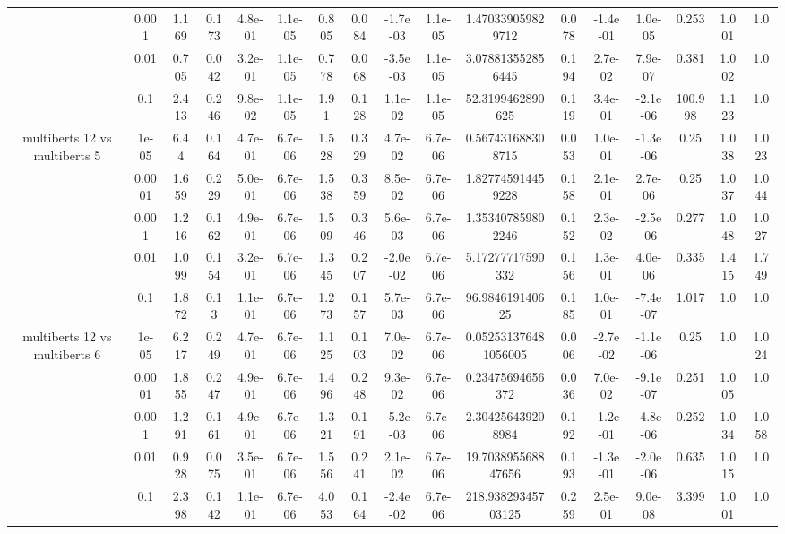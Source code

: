 \begin{tabular}{|c|c|c|c|c|c|c|c|c|c|c|c|c|c|c|c|c|}
 & 0.001 & 1.169 & 0.173 & 4.8e-01 & 1.1e-05 & 0.805 & 0.084 & -1.7e-03 & 1.1e-05 & 1.470339059829712 & 0.078 & -1.4e-01 & 1.0e-05 & 0.253 & 1.001 & 1.0 \\
 & 0.01 & 0.705 & 0.042 & 3.2e-01 & 1.1e-05 & 0.778 & 0.068 & -3.5e-03 & 1.1e-05 & 3.078813552856445 & 0.194 & 2.7e-02 & 7.9e-07 & 0.381 & 1.002 & 1.0 \\
 & 0.1 & 2.413 & 0.246 & 9.8e-02 & 1.1e-05 & 1.91 & 0.128 & 1.1e-02 & 1.1e-05 & 52.3199462890625 & 0.119 & 3.4e-01 & -2.1e-06 & 100.998 & 1.123 & 1.0 \\
\hline
\multirow{5}{*}{multiberts 12 vs multiberts 5} & 1e-05 & 6.44 & 0.164 & 4.7e-01 & 6.7e-06 & 1.528 & 0.329 & 4.7e-02 & 6.7e-06 & 0.567431688308715 & 0.053 & 1.0e-01 & -1.3e-06 & 0.25 & 1.038 & 1.023 \\
 & 0.0001 & 1.659 & 0.229 & 5.0e-01 & 6.7e-06 & 1.538 & 0.359 & 8.5e-02 & 6.7e-06 & 1.827745914459228 & 0.158 & 2.1e-01 & 2.7e-06 & 0.25 & 1.037 & 1.044 \\
 & 0.001 & 1.216 & 0.162 & 4.9e-01 & 6.7e-06 & 1.509 & 0.346 & 5.6e-03 & 6.7e-06 & 1.353407859802246 & 0.152 & 2.3e-02 & -2.5e-06 & 0.277 & 1.048 & 1.027 \\
 & 0.01 & 1.099 & 0.154 & 3.2e-01 & 6.7e-06 & 1.345 & 0.207 & -2.0e-02 & 6.7e-06 & 5.17277717590332 & 0.156 & 1.3e-01 & 4.0e-06 & 0.335 & 1.415 & 1.749 \\
 & 0.1 & 1.872 & 0.13 & 1.1e-01 & 6.7e-06 & 1.273 & 0.157 & 5.7e-03 & 6.7e-06 & 96.984619140625 & 0.185 & 1.0e-01 & -7.4e-07 & 1.017 & 1.0 & 1.0 \\
\hline
\multirow{5}{*}{multiberts 12 vs multiberts 6} & 1e-05 & 6.217 & 0.249 & 4.7e-01 & 6.7e-06 & 1.125 & 0.103 & 7.0e-02 & 6.7e-06 & 0.052531376481056005 & 0.006 & -2.7e-02 & -1.1e-06 & 0.25 & 1.0 & 1.024 \\
 & 0.0001 & 1.855 & 0.247 & 4.9e-01 & 6.7e-06 & 1.496 & 0.248 & 9.3e-02 & 6.7e-06 & 0.23475694656372 & 0.036 & 7.0e-02 & -9.1e-07 & 0.251 & 1.005 & 1.0 \\
 & 0.001 & 1.291 & 0.161 & 4.9e-01 & 6.7e-06 & 1.321 & 0.191 & -5.2e-03 & 6.7e-06 & 2.304256439208984 & 0.192 & -1.2e-01 & -4.8e-06 & 0.252 & 1.034 & 1.058 \\
 & 0.01 & 0.928 & 0.075 & 3.5e-01 & 6.7e-06 & 1.556 & 0.241 & 2.1e-02 & 6.7e-06 & 19.703895568847656 & 0.193 & -1.3e-01 & -2.0e-06 & 0.635 & 1.015 & 1.0 \\
 & 0.1 & 2.398 & 0.142 & 1.1e-01 & 6.7e-06 & 4.053 & 0.164 & -2.4e-02 & 6.7e-06 & 218.93829345703125 & 0.259 & 2.5e-01 & 9.0e-08 & 3.399 & 1.001 & 1.0 \\

\end{tabular}
